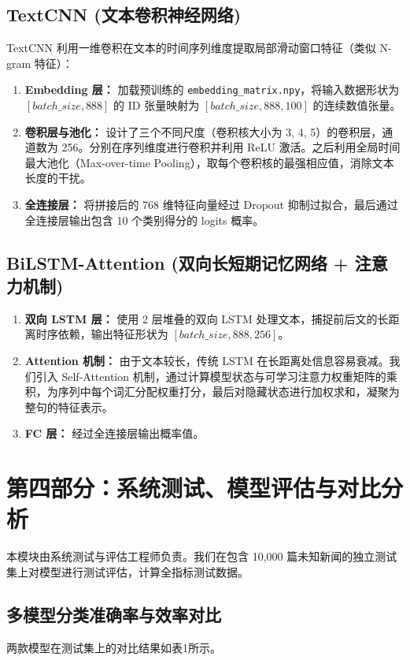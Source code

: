 \documentclass[UTF8,a4paper,11pt]{ctexart}
\begin{document}
\subsection{TextCNN (文本卷积神经网络)}
TextCNN 利用一维卷积在文本的时间序列维度提取局部滑动窗口特征（类似 N-gram 特征）：
\begin{enumerate}
    \item \textbf{Embedding 层：} 加载预训练的 \texttt{embedding\_matrix.npy}，将输入数据形状为 $[batch\_size, 888]$ 的 ID 张量映射为 $[batch\_size, 888, 100]$ 的连续数值张量。
    \item \textbf{卷积层与池化：} 设计了三个不同尺度（卷积核大小为 3, 4, 5）的卷积层，通道数为 256。分别在序列维度进行卷积并利用 ReLU 激活。之后利用全局时间最大池化（Max-over-time Pooling），取每个卷积核的最强相应值，消除文本长度的干扰。
    \item \textbf{全连接层：} 将拼接后的 768 维特征向量经过 Dropout 抑制过拟合，最后通过全连接层输出包含 10 个类别得分的 logits 概率。
\end{enumerate}

\subsection{BiLSTM-Attention (双向长短期记忆网络 + 注意力机制)}
\begin{enumerate}
    \item \textbf{双向 LSTM 层：} 使用 2 层堆叠的双向 LSTM 处理文本，捕捉前后文的长距离时序依赖，输出特征形状为 $[batch\_size, 888, 256]$。
    \item \textbf{Attention 机制：} 由于文本较长，传统 LSTM 在长距离处信息容易衰减。我们引入 Self-Attention 机制，通过计算模型状态与可学习注意力权重矩阵的乘积，为序列中每个词汇分配权重打分，最后对隐藏状态进行加权求和，凝聚为整句的特征表示。
    \item \textbf{FC 层：} 经过全连接层输出概率值。
\end{enumerate}

\section{第四部分：系统测试、模型评估与对比分析}
本模块由系统测试与评估工程师负责。我们在包含 10,000 篇未知新闻的独立测试集上对模型进行测试评估，计算全指标测试数据。

\subsection{多模型分类准确率与效率对比}
两款模型在测试集上的对比结果如表1所示。
\end{document}
